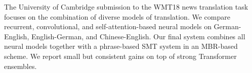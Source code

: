 The University of Cambridge submission to the WMT18 news translation task focuses on the combination of diverse models of translation. We compare recurrent, convolutional, and self-attention-based neural models on German-English, English-German, and Chinese-English. Our final system combines all neural models together with a phrase-based SMT system in an MBR-based scheme. We report small but consistent gains on top of strong Transformer ensembles.

